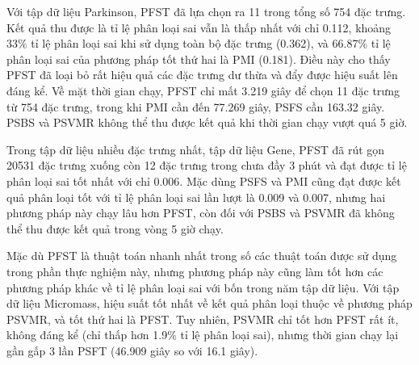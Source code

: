 Với tập dữ liệu Parkinson, PFST đã lựa chọn ra 11 trong tổng số 754 đặc trưng. Kết quả thu được là tỉ lệ phân loại sai vẫn là thấp nhất với chỉ 0.112, khoảng 33\% tỉ lệ phân loại sai khi sử dụng toàn bộ đặc trưng (0.362), và 66.87\% tỉ lệ phân loại sai của phương pháp tốt thứ hai là PMI (0.181). Điều này cho thấy PFST đã loại bỏ rất hiệu quả các đặc trưng dư thừa và đẩy được hiệu suất lên đáng kể. Về mặt thời gian chạy, PFST chỉ mất 3.219 giây để chọn 11 đặc trưng từ 754 đặc trưng, trong khi PMI cần đến 77.269 giây, PSFS cần 163.32 giây. PSBS và PSVMR không thể thu được kết quả khi thời gian chạy vượt quá 5 giờ.

Trong tập dữ liệu nhiều đặc trưng nhất, tập dữ liệu Gene, PFST đã rút gọn 20531 đặc trưng xuống còn 12 đặc trưng trong chưa đầy 3 phút và đạt được tỉ lệ phân loại sai tốt nhất với chỉ 0.006. Mặc dùng PSFS và PMI cũng đạt được kết quả phân loại tốt với tỉ lệ phân loại sai lần lượt là 0.009 và 0.007, nhưng hai phương pháp này chạy lâu hơn PFST, còn đối với PSBS và PSVMR đã không thể thu được kết quả trong vòng 5 giờ chạy.

Mặc dù PFST là thuật toán nhanh nhất trong số các thuật toán được sử dụng trong phần thực nghiệm này, nhưng phương pháp này cũng làm tốt hơn các phương pháp khác về tỉ lệ phân loại sai với bốn trong năm tập dữ liệu. Với tập dữ liệu Micromass, hiệu suất tốt nhất về kết quả phân loại thuộc về phương pháp PSVMR, và tốt thứ hai là PFST. Tuy nhiên, PSVMR chỉ tốt hơn PFST rất ít, không đáng kể (chỉ thấp hơn 1.9\% tỉ lệ phân loại sai), nhưng thời gian chạy lại gần gấp 3 lần PSFT (46.909 giây so với 16.1 giây).


